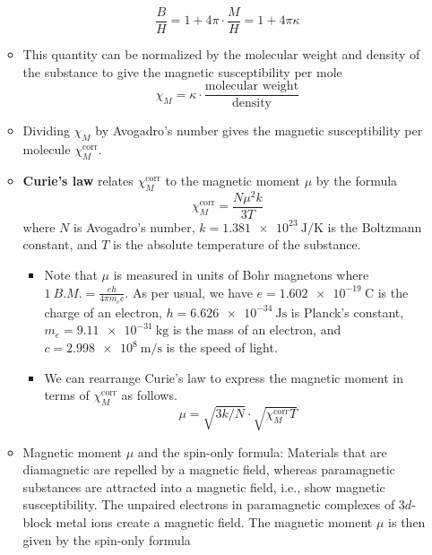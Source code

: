 \documentclass[../notes.tex]{subfiles}
\begin{document}
\begin{itemize}
\begin{itemize}
        \begin{equation*}
            \frac{B}{H} = 1+4\pi\cdot\frac{M}{H} = 1+4\pi\kappa
        \end{equation*}
        \item This quantity can be normalized by the molecular weight and density of the substance to give the magnetic susceptibility per mole
        \begin{equation*}
            \chi_M = \kappa\cdot\frac{\text{molecular weight}}{\text{density}}
        \end{equation*}
        \item Dividing $\chi_M$ by Avogadro's number gives the magnetic susceptibility per molecule $\chi_M^\text{corr}$.
        \item \textbf{Curie's law} relates $\chi_M^\text{corr}$ to the magnetic moment $\mu$ by the formula
        \begin{equation*}
            \chi_M^\text{corr} = \frac{N\mu^2k}{3T}
        \end{equation*}
        where $N$ is Avogadro's number, $k=\SI[per-mode=symbol]{1.381e23}{\joule\per\kelvin}$ is the Boltzmann constant, and $T$ is the absolute temperature of the substance.
        \begin{itemize}
            \item Note that $\mu$ is measured in units of Bohr magnetons where $\SI{1}{B.M.}=\frac{eh}{4\pi m_ec}$. As per usual, we have $e=\SI{1.602e-19}{\coulomb}$ is the charge of an electron, $h=\SI{6.626e-34}{\joule\second}$ is Planck's constant, $m_e=\SI{9.11e-31}{\kilo\gram}$ is the mass of an electron, and $c=\SI[per-mode=symbol]{2.998e8}{\meter\per\second}$ is the speed of light.
            \item We can rearrange Curie's law to express the magnetic moment in terms of $\chi_M^\text{corr}$ as follows.
            \begin{equation*}
                \mu = \sqrt{3k/N}\cdot\sqrt{\chi_M^\text{corr}T}
            \end{equation*}
        \end{itemize}
        \item Magnetic moment $\mu$ and the spin-only formula: Materials that are diamagnetic are repelled by a magnetic field, whereas paramagnetic substances are attracted into a magnetic field, i.e., show magnetic susceptibility. The unpaired electrons in paramagnetic complexes of $3d$-block metal ions create a magnetic field. The magnetic moment $\mu$ is then given by the spin-only formula

\end{itemize}
\end{itemize}
\end{document}
